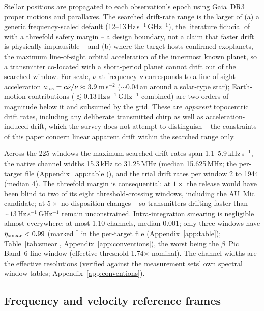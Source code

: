 \documentclass{openjournal}
\begin{document}
Stellar positions are propagated to each observation's epoch using
Gaia~DR3 proper motions and parallaxes. The searched drift-rate range
is the larger of (a) a generic frequency-scaled default
(12--13\,Hz\,s$^{-1}$\,GHz$^{-1}$), the literature fiducial of
\citet{Mason2024} with a threefold safety margin -- a design
boundary, not a claim that faster drift is physically implausible --
and (b) where the target hosts confirmed exoplanets, the maximum
line-of-sight orbital acceleration of the innermost known planet, so
a transmitter co-located with a short-period planet cannot drift out
of the searched window. For scale, $\dot\nu$ at frequency $\nu$
corresponds to a line-of-sight acceleration $a_{\rm los} =
c\dot\nu/\nu \approx 3.9$\,m\,s$^{-2}$ (${\sim}0.04$\,au around a
solar-type star); Earth-motion contributions
($\lesssim0.13$\,Hz\,s$^{-1}$\,GHz$^{-1}$ combined) are two orders of
magnitude below it and subsumed by the grid. These are
\emph{apparent} topocentric drift rates, including any deliberate
transmitted chirp as well as acceleration-induced drift, which the
survey does not attempt to distinguish -- the constraints of this
paper concern linear apparent drift within the searched range only.

Across the 225 windows the maximum searched drift rates span
1.1--5.9\,kHz\,s$^{-1}$, the native channel widths 15.3\,kHz to
31.25\,MHz (median 15.625\,MHz; the per-target file (Appendix~\ref{app:table})), and the trial
drift rates per window 2 to 1944 (median 4). The threefold margin is
consequential: at $1\times$ the release would have been blind to two
of its eight threshold-crossing windows, including the AU~Mic
candidate; at $5\times$ no disposition changes -- so transmitters
drifting faster than
${\sim}13$\,Hz\,s$^{-1}$\,GHz$^{-1}$ remain unconstrained.
Intra-integration smearing is negligible almost everywhere: at most
1.10 channels, median 0.001; only three windows have
$\eta_{\rm smear} < 0.99$ (marked $^{\ast}$ in the per-target file (Appendix~\ref{app:table});
Table~\ref{tab:smear}, Appendix~\ref{app:conventions}), the worst
being the $\beta$~Pic Band~6 fine window (effective threshold
1.74$\times$ nominal). The channel widths are the effective
resolutions (verified against the measurement sets' own spectral
window tables; Appendix~\ref{app:conventions}).

\subsection{Frequency and velocity reference frames}
\label{sec:frames}
\end{document}
